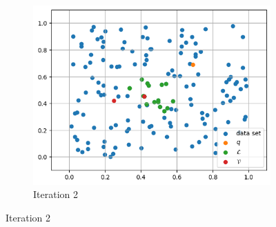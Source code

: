 \begin{figure}[h]
\begin{subfigure}{0.31\textwidth}
            \includegraphics[width=\textwidth]{images/greedy-search-2}
            \caption{Iteration 2}
        \end{subfigure}
        \hfill
    \end{figure}


